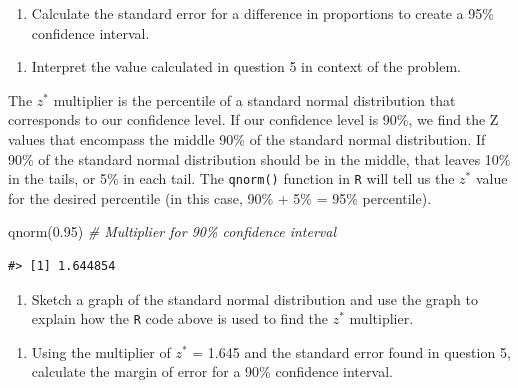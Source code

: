 \documentclass[
]{report}
\newenvironment{Shaded}{\begin{snugshade}}{\end{snugshade}}
\newcommand{\CommentTok}[1]{\textcolor[rgb]{0.56,0.35,0.01}{\textit{#1}}}
\newcommand{\FloatTok}[1]{\textcolor[rgb]{0.00,0.00,0.81}{#1}}
\newcommand{\FunctionTok}[1]{\textcolor[rgb]{0.00,0.00,0.00}{#1}}
\newcommand{\NormalTok}[1]{#1}
\providecommand{\tightlist}{%
  \setlength{\itemsep}{0pt}\setlength{\parskip}{0pt}}
\begin{document}
\begin{enumerate}
\def\labelenumi{\arabic{enumi}.}
\setcounter{enumi}{5}
\tightlist
\item
  Calculate the standard error for a difference in proportions to create a 95\% confidence interval.
\end{enumerate}

\vspace{1in}

\begin{enumerate}
\def\labelenumi{\arabic{enumi}.}
\setcounter{enumi}{6}
\tightlist
\item
  Interpret the value calculated in question 5 in context of the problem.
\end{enumerate}

\vspace{1in}

\newpage

The \(z^*\) multiplier is the percentile of a standard normal distribution that corresponds to our confidence level. If our confidence level is 90\%, we find the Z values that encompass the middle 90\% of the standard normal distribution. If 90\% of the standard normal distribution should be in the middle, that leaves 10\% in the tails, or 5\% in each tail. The \texttt{qnorm()} function in \texttt{R} will tell us the \(z^*\) value for the desired percentile (in this case, 90\% + 5\% = 95\% percentile).

\begin{Shaded}
\begin{Highlighting}[]
\FunctionTok{qnorm}\NormalTok{(}\FloatTok{0.95}\NormalTok{) }\CommentTok{\# Multiplier for 90\% confidence interval}
\end{Highlighting}
\end{Shaded}

\begin{verbatim}
#> [1] 1.644854
\end{verbatim}

\begin{enumerate}
\def\labelenumi{\arabic{enumi}.}
\setcounter{enumi}{7}
\tightlist
\item
  Sketch a graph of the standard normal distribution and use the graph to explain how the \texttt{R} code above is used to find the \(z^*\) multiplier.
\end{enumerate}

\vspace{1.5in}

\begin{enumerate}
\def\labelenumi{\arabic{enumi}.}
\setcounter{enumi}{8}
\tightlist
\item
  Using the multiplier of \(z^*\) = 1.645 and the standard error found in question 5, calculate the margin of error for a 90\% confidence interval.
\end{enumerate}
\end{document}
